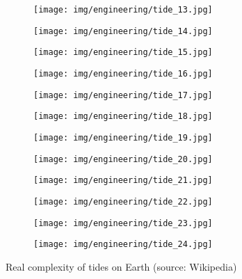 	\begin{figure}[H]
		\centering
		\begin{subfigure}{.4\textwidth}
		  \centering
		  \texttt{[image: img/engineering/tide\_13.jpg]}
		\end{subfigure}
		\begin{subfigure}{.4\textwidth}
		  \centering
		  \texttt{[image: img/engineering/tide\_14.jpg]}
		\end{subfigure}
		\begin{subfigure}{.4\textwidth}
		  \centering
		  \texttt{[image: img/engineering/tide\_15.jpg]}
		\end{subfigure}
		\begin{subfigure}{.4\textwidth}
		  \centering
		  \texttt{[image: img/engineering/tide\_16.jpg]}
		\end{subfigure}
		\begin{subfigure}{.4\textwidth}
		  \centering
		  \texttt{[image: img/engineering/tide\_17.jpg]}
		\end{subfigure}
		\begin{subfigure}{.4\textwidth}
		  \centering
		  \texttt{[image: img/engineering/tide\_18.jpg]}
		\end{subfigure}
		\begin{subfigure}{.4\textwidth}
		  \centering
		  \texttt{[image: img/engineering/tide\_19.jpg]}
		\end{subfigure}
		\begin{subfigure}{.4\textwidth}
		  \centering
		  \texttt{[image: img/engineering/tide\_20.jpg]}
		\end{subfigure}
		\begin{subfigure}{.4\textwidth}
		  \centering
		  \texttt{[image: img/engineering/tide\_21.jpg]}
		\end{subfigure}
		\begin{subfigure}{.4\textwidth}
		  \centering
		  \texttt{[image: img/engineering/tide\_22.jpg]}
		\end{subfigure}
		\begin{subfigure}{.4\textwidth}
		  \centering
		  \texttt{[image: img/engineering/tide\_23.jpg]}
		\end{subfigure}
		\begin{subfigure}{.4\textwidth}
		  \centering
		  \texttt{[image: img/engineering/tide\_24.jpg]}
		\end{subfigure}
		\caption[Real complexity of tides on Earth]{Real complexity of tides on Earth (source: Wikipedia)}
	\end{figure}
